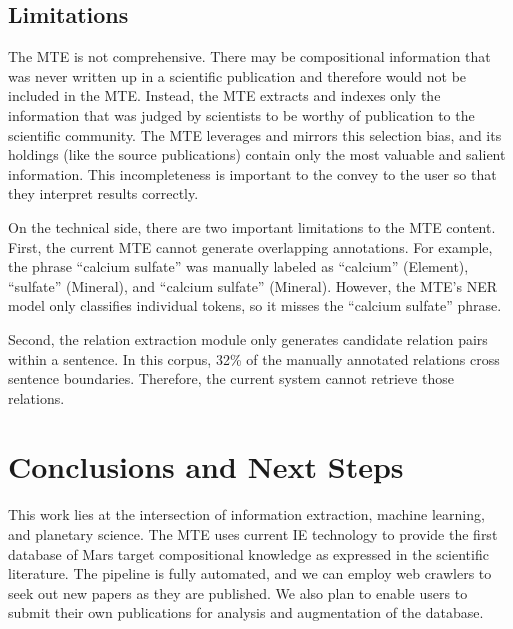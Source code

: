 \documentclass[letterpaper]{article} %
\begin{document}
\subsection{Limitations}

The MTE is not comprehensive.  There may be compositional information
that was never written up in a scientific publication and therefore
would not be included in the MTE.  Instead, the MTE extracts and
indexes only the information that was judged by scientists to be
worthy of publication to the scientific community.  The MTE leverages
and mirrors this selection bias, and its holdings (like the source
publications) contain only the most valuable and salient information.
This incompleteness is important to the convey to the user so that
they interpret results correctly.

On the technical side, there are two important limitations to the MTE
content.  First, the current MTE cannot generate overlapping
annotations.  For example, the phrase ``calcium sulfate'' was manually
labeled as ``calcium'' (Element), ``sulfate'' (Mineral), and
``calcium sulfate'' (Mineral).  However, the MTE's NER model only
classifies individual tokens, so it misses the ``calcium sulfate''
phrase. 

Second, the relation extraction module only generates candidate
relation pairs within a sentence.  In this corpus, 32\% of the
manually annotated relations cross sentence boundaries.  Therefore,
the current system cannot retrieve those relations.



\section{Conclusions and Next Steps}

This work lies at the intersection of information extraction, machine
learning, and planetary science.  The MTE uses current IE technology
to provide the first database of Mars target compositional knowledge
as expressed in the scientific literature.  The pipeline is fully
automated, and we can employ web crawlers to seek out new papers as
they are published.  We also plan to enable users to submit their own
publications for analysis and augmentation of the database.
\end{document}
